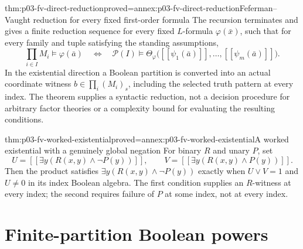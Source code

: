 \begin{hbtheorem}{thm:p03-fv-direct-reduction}{proved=annex:p03-fv-direct-reduction}{Feferman--Vaught reduction for every fixed first-order formula}
The recursion terminates and gives a finite reduction sequence for every
fixed \(L\)-formula \(\varphi(\bar x)\), such that for every family
and tuple satisfying the standing assumptions,
\[
 \prod_{i\in I}M_i\models\varphi(\bar a)
 \quad\Longleftrightarrow\quad
 \mathcal P(I)\models\Theta_{\varphi}
 \bigl([\![\psi_1(\bar a)]\!],\ldots,
                    [\![\psi_m(\bar a)]\!]\bigr).
\]
In the existential direction a Boolean partition is converted into an
actual coordinate witness \(b\in\prod_i(M_i)_s\), including the
selected truth pattern at every index. The theorem supplies a syntactic
reduction, not a decision procedure for arbitrary factor theories or a
complexity bound for evaluating the resulting conditions.
\end{hbtheorem}
\begin{hbtheorem}{thm:p03-fv-worked-existential}{proved=annex:p03-fv-worked-existential}{A worked existential with a genuinely global negation}
For binary \(R\) and unary \(P\), set
\[
 U=[\![\exists y(R(x,y)\land\neg P(y))]\!],\qquad
 V=[\![\exists y(R(x,y)\land P(y))]\!].
\]
Then the product satisfies \(\exists y(R(x,y)\land\neg P(y))\)
exactly when \(U\vee V=1\) and \(U\ne0\) in its index Boolean algebra.
The first condition supplies an \(R\)-witness at every index; the second
requires failure of \(P\) at some index, not at every index.
\end{hbtheorem}

\section{Finite-partition Boolean powers}

